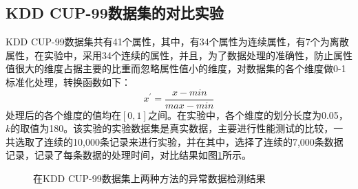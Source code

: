 \subsection{KDD CUP-99数据集的对比实验}
KDD CUP-99数据集共有41个属性，其中，有34个属性为连续属性，有7个为离散属性，在实验中，采用34个连续的属性，并且，为了数据处理的准确性，防止属性值很大的维度占据主要的比重而忽略属性值小的维度，对数据集的各个维度做0-1标准化处理，转换函数如下：
\begin{equation}
x^{'}=\frac{x-min}{max- min}
\end{equation}
处理后的各个维度的值均在$\left [ 0,1 \right ]$之间。在实验中，各个维度的划分长度为0.05，$k$的取值为180。该实验的实验数据集是真实数据，主要进行性能测试的比较，一共选取了连续的10,000条记录来进行实验，并在其中，选择了连续的7,000条数据记录，记录了每条数据的处理时间，对比结果如图\ref{fig:fig512}所示。
\begin{figure}[htbp]
	\centering                                      %
	\caption{在KDD CUP-99数据集上两种方法的异常数据检测结果} %
	\label{fig:fig512}                                       %
\end{figure}

